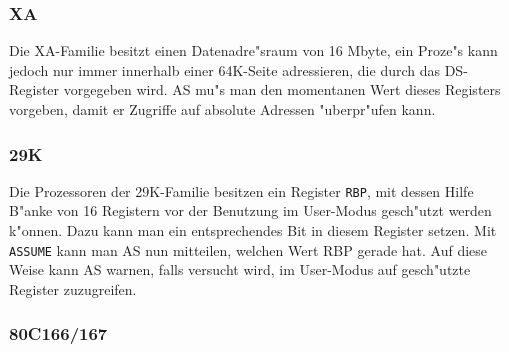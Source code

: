 \documentclass[12pt,a4paper,twoside]{report}
\newcommand{\tty}[1]{{\tt #1}}
\newcommand{\asname}{AS}
\begin{document}

\subsubsection{XA}

Die XA-Familie besitzt einen Datenadre"sraum von 16 Mbyte, ein Proze"s
kann jedoch nur immer innerhalb einer 64K-Seite adressieren, die
durch das DS-Register vorgegeben wird.  \asname{} mu"s man den momentanen
Wert dieses Registers vorgeben, damit er Zugriffe auf absolute
Adressen "uberpr"ufen kann.


\subsubsection{29K}

Die Prozessoren der 29K-Familie besitzen ein Register \tty{RBP}, mit dessen
Hilfe B"anke von 16 Registern vor der Benutzung im User-Modus gesch"utzt
werden k"onnen.  Dazu kann man ein entsprechendes Bit in diesem Register
setzen.  Mit \tty{ASSUME} kann man \asname{} nun mitteilen, welchen Wert RBP
gerade hat.  Auf diese Weise kann \asname{} warnen, falls versucht wird, im
User-Modus auf gesch"utzte Register zuzugreifen.


\subsubsection{80C166/167}
\end{document}
